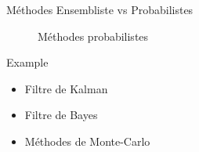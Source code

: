 \documentclass[9pt, xcolor={usenames, dvipsnames}]{beamer}
\begin{document}
\begin{frame}{Méthodes Ensembliste vs Probabilistes}
\begin{minipage}[t]{0.45\textwidth}
\begin{figure}
							\caption{Méthodes probabilistes}
						\end{figure}
						\begin{exampleblock}{Example}
							\begin{itemize}
								\item Filtre de Kalman
								\item Filtre de Bayes
								\item Méthodes de Monte-Carlo
							\end{itemize}
						\end{exampleblock}
					\end{minipage}
				\end{frame}
				
				
\end{document}
